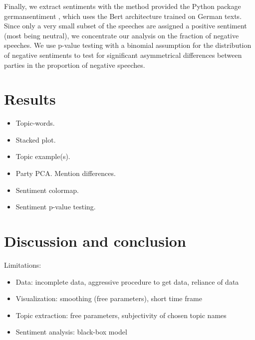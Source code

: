 \documentclass{article}
\begin{document}
Finally, we extract sentiments with the method provided the Python package germansentiment \cite{Germansentiment}, which uses the Bert architecture trained on German texts.
Since only a very small subset of the speeches are assigned a positive sentiment (most being neutral), we concentrate our analysis on the fraction of negative speeches.
We use p-value testing with a binomial assumption for the distribution of negative sentiments to test for significant asymmetrical differences between parties in the proportion of negative speeches.

\section{Results}
\begin{itemize}
  \item Topic-words.
  \item Stacked plot.
  \item Topic example(s).
  \item Party PCA. Mention differences.
  \item Sentiment colormap.
  \item Sentiment p-value testing.
\end{itemize}

\section{Discussion and conclusion}
Limitations:
\begin{itemize}
  \item Data: incomplete data, aggressive procedure to get data, reliance of data
  \item Visualization: smoothing (free parameters), short time frame
  \item Topic extraction: free parameters, subjectivity of chosen topic names
  \item Sentiment analysis: black-box model
\end{itemize}



\end{document}
